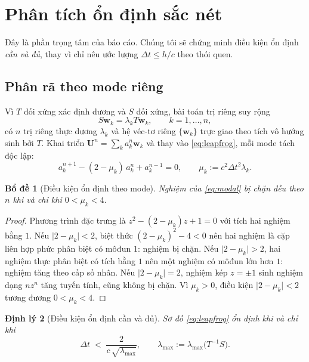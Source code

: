 \documentclass[11pt,a4paper]{article}
\theoremstyle{plain}
\newtheorem{theorem}{Định lý}[section]
\newtheorem{lemma}[theorem]{Bổ đề}
\theoremstyle{definition}
\theoremstyle{remark}
\newcommand{\dt}{\Delta t}
\newcommand{\Uvec}{\bm{U}}
\newcommand{\lammax}{\lambda_{\max}}
\begin{document}
\section{Phân tích ổn định sắc nét}
\label{sec:ondinh}

Đây là phần trọng tâm của báo cáo. Chúng tôi sẽ chứng minh điều kiện ổn định
\emph{cần và đủ}, thay vì chỉ nêu ước lượng $\dt \le h/c$ theo thói quen.

\subsection{Phân rã theo mode riêng}

Vì $T$ đối xứng xác định dương và $S$ đối xứng, bài toán trị riêng suy rộng
\begin{equation}
\label{eq:eig}
  S\bm{w}_{k} = \lambda_{k} T \bm{w}_{k}, \qquad k = 1,\dots,n,
\end{equation}
có $n$ trị riêng thực dương $\lambda_{k}$ và hệ véc-tơ riêng
$\{\bm{w}_{k}\}$ trực giao theo tích vô hướng sinh bởi $T$. Khai triển
$\Uvec^{n} = \sum_{k} a_{k}^{n}\bm{w}_{k}$ và thay vào \eqref{eq:leapfrog},
mỗi mode tách độc lập:
\begin{equation}
\label{eq:modal}
  a_{k}^{n+1} - (2 - \mu_{k})\,a_{k}^{n} + a_{k}^{n-1} = 0,
  \qquad \mu_{k} := c^{2}\dt^{2}\lambda_{k}.
\end{equation}

\begin{lemma}[Điều kiện ổn định theo mode]
\label{lem:mode}
Nghiệm của \eqref{eq:modal} bị chặn đều theo $n$ khi và chỉ khi
$0 < \mu_{k} < 4$.
\end{lemma}

\begin{proof}
Phương trình đặc trưng là $z^{2} - (2-\mu_{k})z + 1 = 0$ với tích hai nghiệm
bằng $1$. Nếu $\lvert 2-\mu_{k}\rvert < 2$, biệt thức
$(2-\mu_{k})^{2} - 4 < 0$ nên hai nghiệm là cặp liên hợp phức phân biệt có
môđun $1$: nghiệm bị chặn. Nếu $\lvert 2-\mu_{k}\rvert > 2$, hai nghiệm thực
phân biệt có tích bằng $1$ nên một nghiệm có môđun lớn hơn $1$: nghiệm tăng
theo cấp số nhân. Nếu $\lvert 2-\mu_{k}\rvert = 2$, nghiệm kép $z = \pm 1$
sinh nghiệm dạng $n z^{n}$ tăng tuyến tính, cũng không bị chặn. Vì
$\mu_{k} > 0$, điều kiện $\lvert 2-\mu_{k}\rvert < 2$ tương đương
$0 < \mu_{k} < 4$.
\end{proof}

\begin{theorem}[Điều kiện ổn định cần và đủ]
\label{thm:cfl}
Sơ đồ \eqref{eq:leapfrog} ổn định khi và chỉ khi
\begin{equation}
\label{eq:cfl-sharp}
  \boxed{\;\dt \;<\; \frac{2}{c\,\sqrt{\lammax}},
  \qquad \lammax := \lambda_{\max}\bigl(T^{-1}S\bigr).\;}
\end{equation}
\end{theorem}
\end{document}
